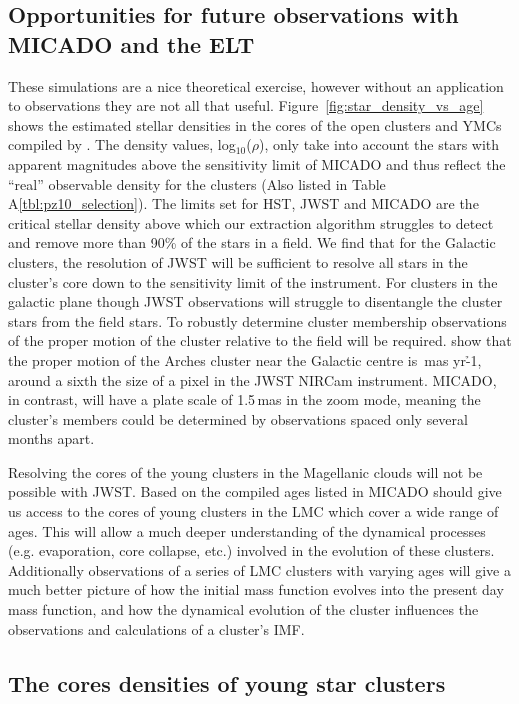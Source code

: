 \subsection{Opportunities for future observations with MICADO and the ELT}

These simulations are a nice theoretical exercise, however without an
application to observations they are not all that useful.
Figure~\ref{fig:star_density_vs_age} shows the estimated stellar densities in
the cores of the open clusters and YMCs compiled by \citet{portegies2010}. The
density values, log$_{10}$($\rho$), only take into account the stars with
apparent magnitudes above the sensitivity limit of MICADO and thus reflect the
``real'' observable density for the clusters (Also listed in Table
A\ref{tbl:pz10_selection}). The limits set for HST, JWST and MICADO are the
critical stellar density above which our extraction algorithm struggles to
detect and remove more than 90\% of the stars in a field. We find that for the
Galactic clusters, the resolution of JWST will be sufficient to resolve all
stars in the cluster's core down to the sensitivity limit of the instrument.
For clusters in the galactic plane though JWST observations will struggle to
disentangle the cluster stars from the field stars. To robustly determine
cluster membership observations of the proper motion of the cluster relative to
the field will be required. \citet{stolte2008} show that the proper motion of
the Arches cluster near the Galactic centre is \,mas yr\h{-1}, around a
sixth the size of a pixel in the JWST NIRCam instrument. MICADO, in contrast,
will have a plate scale of 1.5\,mas in the zoom mode, meaning the cluster's
members could be determined by observations spaced only several months apart.

Resolving the cores of the young clusters in the Magellanic clouds will not be
possible with JWST. Based on the compiled ages listed in \citet{portegies2010}
MICADO should give us access to the cores of young clusters in the LMC which
cover a wide range of ages. This will allow a much deeper understanding of the
dynamical processes (e.g. evaporation, core collapse, etc.) involved in the
evolution of these clusters. Additionally observations of a series of LMC
clusters with varying ages will give a much better picture of how the initial
mass function evolves into the present day mass function, and how the dynamical
evolution of the cluster influences the observations and calculations of a
cluster's IMF.


\subsection{The cores densities of young star clusters}

